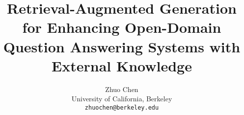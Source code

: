 \documentclass[11pt]{article}
\title{Retrieval-Augmented Generation for Enhancing Open-Domain Question Answering Systems with External Knowledge}
\author{
  Zhuo Chen \\
  University of California, Berkeley \\
  { \normalsize \tt  zhuochen@berkeley.edu} \\
}
\begin{document}
\maketitle

\begin{abstract}

\end{abstract}















\clearpage




\clearpage

\appendix


\end{document}
